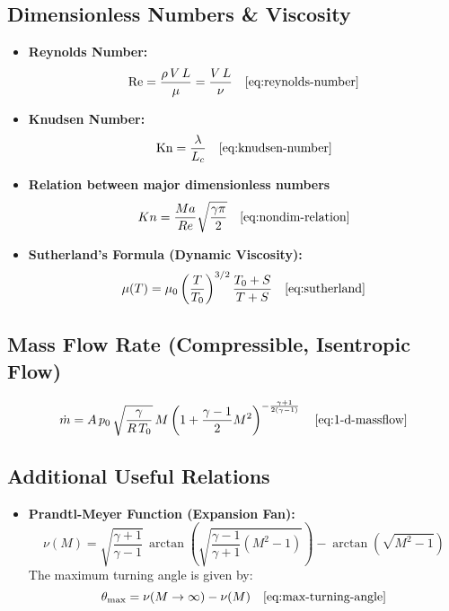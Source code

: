 \subsection*{Dimensionless Numbers \& Viscosity}
\begin{itemize}
    \item \textbf{Reynolds Number:}  
    $$
	    \text{Re} = \frac{\rho\,V\,L}{\mu} = \frac{V\,L}{\nu} \quad \eqref{eq:reynolds-number}
    $$
    \item \textbf{Knudsen Number:}  
    $$
	    \text{Kn} = \frac{\lambda}{L_c}\quad \eqref{eq:knudsen-number}
    $$
	\item \textbf{Relation between major dimensionless numbers}
	$$
		Kn = \frac{Ma}{Re}\sqrt{\frac{\gamma \pi}{2}} \quad \eqref{eq:nondim-relation}
	$$
    \item \textbf{Sutherland’s Formula (Dynamic Viscosity):}  
    $$
	    \mu(T) = \mu_0\left(\frac{T}{T_0}\right)^{3/2}\frac{T_0+S}{T+S} \quad \eqref{eq:sutherland}
    $$
\end{itemize}

\subsection*{Mass Flow Rate (Compressible, Isentropic Flow)}
$$
	\dot{m} = A\,p_0\,\sqrt{\frac{\gamma}{R\,T_0}}\,M\left(1+\frac{\gamma-1}{2}M^2\right)^{-\frac{\gamma+1}{2(\gamma-1)}} \quad \eqref{eq:1-d-massflow}
$$

\subsection*{Additional Useful Relations}
\begin{itemize}
    \item \textbf{Prandtl-Meyer Function (Expansion Fan):}  
    $$
    \nu(M) = \sqrt{\frac{\gamma+1}{\gamma-1}}\,\arctan\!\left(\sqrt{\frac{\gamma-1}{\gamma+1}(M^2-1)}\right) - \arctan\!\left(\sqrt{M^2-1}\right)
    $$
    The maximum turning angle is given by:
    $$
	    \theta_{\text{max}} = \nu(M\to\infty) - \nu(M) \quad \eqref{eq:max-turning-angle}
    $$
\end{itemize}
